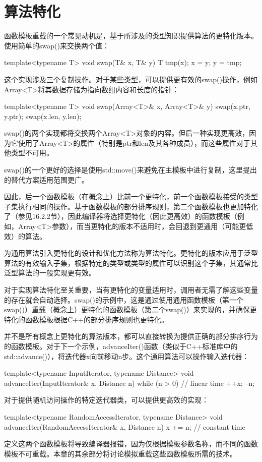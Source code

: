 \section{算法特化}

函数模板重载的一个常见动机是，基于所涉及的类型知识提供算法的更特化版本。使用简单的swap()来交换两个值：

\begin{cpp}
template<typename T>
void swap(T& x, T& y) {
	T tmp(x);
	x = y;
	y = tmp;
}
\end{cpp}

这个实现涉及三个复制操作。对于某些类型，可以提供更有效的swap()操作，例如Array<T>将其数据存储为指向数组内容和长度的指针：

\begin{cpp}
template<typename T>
void swap(Array<T>& x, Array<T>& y) {
	swap(x.ptr, y.ptr);
	swap(x.len, y.len);
}
\end{cpp}

swap()的两个实现都将交换两个Array<T>对象的内容。但后一种实现更高效，因为它使用了Array<T>的属性（特别是ptr和len及其各种成员），而这些属性对于其他类型不可用。

\begin{notice}
swap()的一个更好的选择是使用std::move()来避免在主模板中进行复制，这里提出的替代方案适用范围更广。
\end{notice}

因此，后一个函数模板（在概念上）比前一个更特化，前一个函数模板接受的类型子集执行相同的操作。基于函数模板的部分排序规则，第二个函数模板也更加特化了（参见16.2.2节），因此编译器将选择更特化（因此更高效）的函数模板（例如，Array<T>参数），而当更特化的版本不适用时，会回退到更通用（可能更低效）的算法。

为通用算法引入更特化的设计和优化方法称为算法特化。更特化的版本应用于泛型算法的有效输入子集，根据特定的类型或类型的属性可以识别这个子集，其通常比泛型算法的一般实现更有效。

对于实现算法特化至关重要，当有更特化的变量适用时，调用者无需了解这些变量的存在就会自动选择。swap()的示例中，这是通过使用通用函数模板（第一个swap()）重载（概念上）更特化的函数模板（第二个swap()）来实现的，并确保更特化的函数模板根据C++的部分排序规则也更特化。

并不是所有概念上更特化的算法版本，都可以直接转换为提供正确的部分排序行为的函数模板。对于下一个示例，advanceIter()函数（类似于C++标准库中的std::advance()），将迭代器x向前移动n步。这个通用算法可以操作输入迭代器：

\begin{cpp}
template<typename InputIterator, typename Distance>
void advanceIter(InputIterator& x, Distance n) {
	while (n > 0) { // linear time
		++x;
		--n;
	}
}
\end{cpp}

对于提供随机访问操作的特定迭代器类，可以提供更高效的实现：

\begin{cpp}
template<typename RandomAccessIterator, typename Distance>
void advanceIter(RandomAccessIterator& x, Distance n) {
	x += n; // constant time
}
\end{cpp}

定义这两个函数模板将导致编译器报错，因为仅根据模板参数名称，而不同的函数模板不可重载。本章的其余部分将讨论模拟重载这些函数模板所需的技术。











